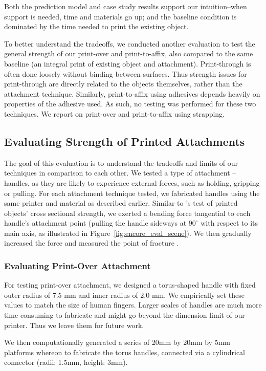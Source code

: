 Both the prediction model and case study results support our intuition--when support is needed, time and materials go up; and the baseline condition is dominated by the time needed to print the existing object.

To better understand the tradeoffs, we conducted another evaluation to test the general strength of our print-over and print-to-affix, also compared to the same baseline (an integral print of existing object and attachment). Print-through is often done loosely without binding between surfaces. Thus strength issues for print-through are directly related to the objects themselves, rather than the attachment technique. Similarly, print-to-affix using adhesives depends heavily on properties of the adhesive used. As such, no testing was performed for these two techniques. We report on print-over and print-to-affix using strapping.

\subsection{Evaluating Strength of Printed Attachments}
The goal of this evaluation is to understand the tradeoffs and limits of our techniques in comparison to each other. We tested a type of attachment – handles, as they are likely to experience external forces, such as holding, gripping or pulling. For each attachment technique tested, we fabricated handles using the same printer and material as described earlier. Similar to \cite{umetani2013cross}'s test of printed objects' cross sectional strength, we exerted a bending force tangential to each handle's attachment point (pulling the handle sideways at $90^{\circ}$ with respect to its main axis, as illustrated in Figure~\ref{fig:encore_eval_scene}). We then gradually increased the force and measured the point of fracture \cite{tetelman1967fracture}.

\subsubsection{Evaluating Print-Over Attachment}
For testing print-over attachment, we designed a torus-shaped handle with fixed outer radius of 7.5 mm and inner radius of 2.0 mm. We empirically set these values to match the size of human fingers. Larger scales of handles are much more time-consuming to fabricate and might go beyond the dimension limit of our printer. Thus we leave them for future work.

We then computationally generated a series of 20mm by 20mm by 5mm platforms whereon to fabricate the torus handles, connected via a cylindrical connector (radii: 1.5mm, height: 3mm).

